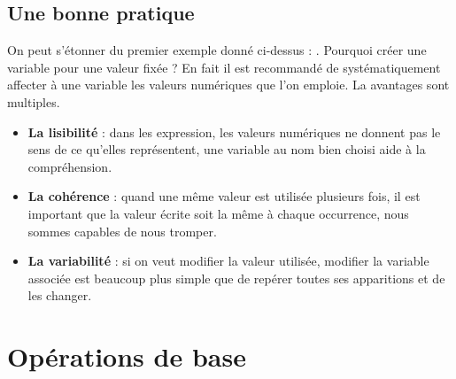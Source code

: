 \subsection{Une bonne pratique}
On peut s'étonner du premier exemple donné ci-dessus : . Pourquoi créer une variable pour une valeur fixée ? En fait il est recommandé de systématiquement affecter à une variable les valeurs numériques que l'on emploie. La avantages sont multiples.
\begin{itemize}
    \item {\bf La lisibilité} : dans les expression, les valeurs numériques ne donnent pas le sens de ce qu'elles représentent, une variable au nom bien choisi aide à la compréhension.
    \item {\bf La cohérence} : quand une même valeur est utilisée plusieurs fois, il est important que la valeur écrite soit la même à chaque occurrence, nous sommes capables de nous tromper.
    \item {\bf La variabilité} :  si on veut modifier la valeur utilisée, modifier la variable associée est beaucoup plus simple que de repérer toutes ses apparitions et de les changer.
\end{itemize}
\newpage
\section{Opérations de base}
